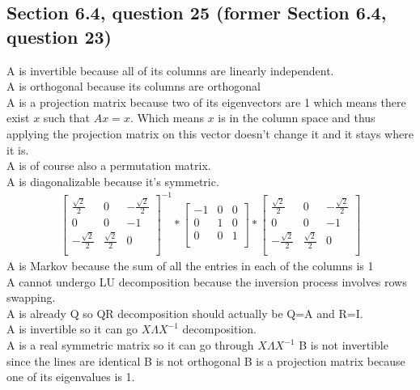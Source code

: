 \documentclass[a4paper,11pt]{article}
\begin{document}
\subsection*{Section 6.4, question 25 (former Section 6.4, question 23)}
A is invertible because all of its columns are linearly independent.\\
A is orthogonal because its columns are orthogonal\\
A is a projection matrix because two of its eigenvectors are 1 which means there exist $x$ such that $Ax=x$. Which means $x$ is in the column space and thus applying the projection matrix on this vector doesn't change it and it stays where it is.\\
A is of course also a permutation matrix.\\
A is diagonalizable because it's symmetric. \\
\begin{align*}
\begin{bmatrix}
\frac{\sqrt{2}}{2} & 0 & -\frac{\sqrt{2}}{2} \\
0 & 0 & -1 \\
-\frac{\sqrt{2}}{2} & \frac{\sqrt{2}}{2} & 0\\
\end{bmatrix}^{-1}*
\begin{bmatrix}
-1& 0 & 0 \\
0 & 1 & 0 \\
0 & 0 & 1 \\
\end{bmatrix}*
\begin{bmatrix}
\frac{\sqrt{2}}{2} & 0 & -\frac{\sqrt{2}}{2} \\
0 & 0 & -1 \\
-\frac{\sqrt{2}}{2} & \frac{\sqrt{2}}{2} & 0\\
\end{bmatrix}
\end{align*}
A is Markov because the sum of all the entries in each of the columns is 1\\
A cannot undergo LU decomposition because the inversion process involves rows swapping.\\
A is already Q so QR decomposition should actually be Q=A and R=I.\\
A is invertible so it can go $X\Lambda{X^{-1}}$ decomposition.\\
A is a real symmetric matrix so it can go through $X\Lambda{X^{-1}}$
B is not invertible since the lines are identical 
B is not orthogonal
B is a projection matrix because one of its eigenvalues is 1.
\end{document}
